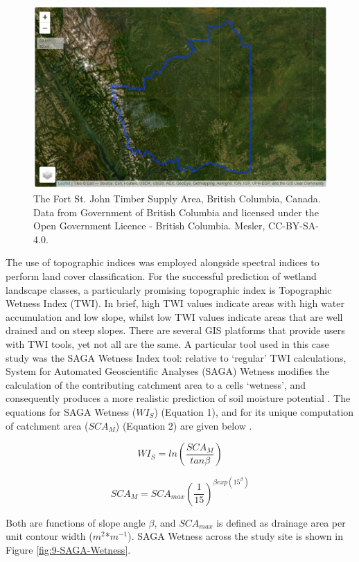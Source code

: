 \documentclass[
]{book}
\begin{document}
\begin{figure}
\includegraphics[width=14.03in]{images/09-fort-st-john-study-area} \caption{The Fort St. John Timber Supply Area, British Columbia, Canada. Data from Government of British Columbia and licensed under the Open Government Licence - British Columbia. Mesler, CC-BY-SA-4.0.}\label{fig:9-fort-st-john-study-area}
\end{figure}

The use of topographic indices was employed alongside spectral indices to perform land cover classification. For the successful prediction of wetland landscape classes, a particularly promising topographic index is Topographic Wetness Index (TWI). In brief, high TWI values indicate areas with high water accumulation and low slope, whilst low TWI values indicate areas that are well drained and on steep slopes. There are several GIS platforms that provide users with TWI tools, yet not all are the same. A particular tool used in this case study was the SAGA Wetness Index tool: relative to `regular' TWI calculations, System for Automated Geoscientific Analyses (SAGA) Wetness modifies the calculation of the contributing catchment area to a cells `wetness', and consequently produces a more realistic prediction of soil moisture potential \citep{mattivi_twi_2019}. The equations for SAGA Wetness (\(WI_S\)) (Equation 1), and for its unique computation of catchment area (\(SCA_M\)) (Equation 2) are given below \citep{bohner_spatial_2006}.

\[
\tag{Equation 1} 
WI_S = ln (\frac{SCA_M}{tan\beta})
\]

\[
\tag{Equation 2}
SCA_M = SCA_{max} (\frac{1}{15})^{\beta exp(15^{\beta})}
\]

Both are functions of slope angle \(\beta\), and \(SCA_{max}\) is defined as drainage area per unit contour width (\(m^2\)*\(m^{-1}\)). SAGA Wetness across the study site is shown in Figure \ref{fig:9-SAGA-Wetness}.
\end{document}
